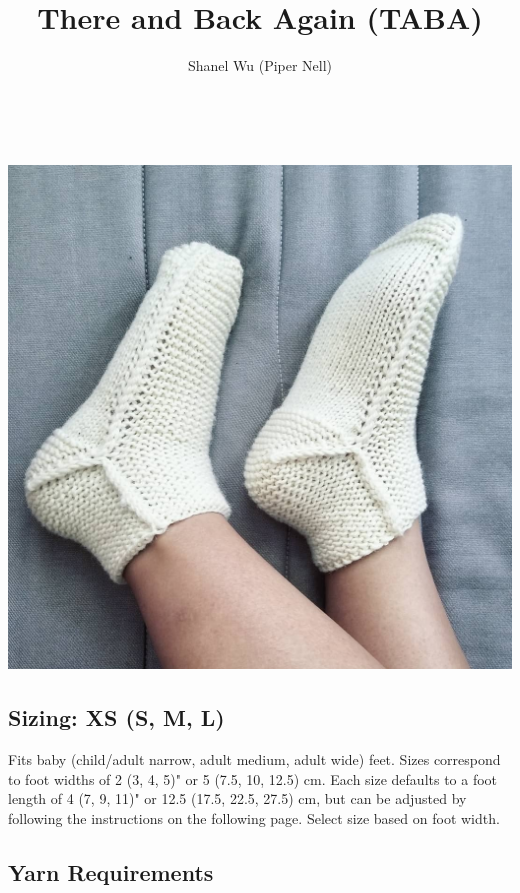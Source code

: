 \documentclass[12pt]{article}
\title{There and Back Again (TABA)} %
\author{Shanel Wu (Piper Nell)}
\begin{document}
\begin{titlingpage}


{\selectfont
\HUGE\textbf{\thetitle}\\ %
\normalsize\theauthor
}

\begin{multicols}{2}

\includegraphics[width=\linewidth]{taba.jpg}

\small
\vspace{-1em}
\subsection*{Sizing: XS (S, M, L)}

Fits baby (child/adult narrow, adult medium, adult wide) feet. Sizes correspond to foot widths of 2 (3, 4, 5)" or 5 (7.5, 10, 12.5) cm. Each size defaults to a foot length of 4 (7, 9, 11)" or 12.5 (17.5, 22.5, 27.5) cm, but can be adjusted by following the instructions on the following page. Select size based on foot width.

\subsection*{Yarn Requirements}


\end{multicols}
\end{titlingpage}
\end{document}
